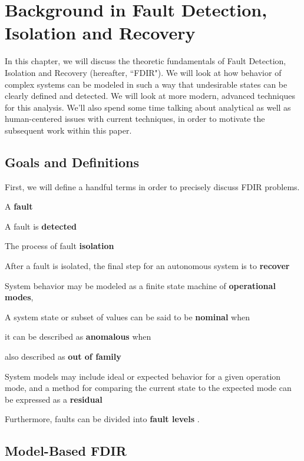 \chapter{Background in Fault Detection, Isolation and Recovery}

In this chapter, we will discuss the theoretic fundamentals of Fault Detection, Isolation and Recovery (hereafter, ``FDIR"). We will look at how behavior of complex systems can be modeled in such a way that undesirable states can be clearly defined and detected. We will look at more modern, advanced techniques for this analysis. We'll also spend some time talking about analytical as well as human-centered issues with current techniques, in order to motivate the subsequent work within this paper.

\section{Goals and Definitions}

First, we will define a handful terms in order to precisely discuss FDIR problems.

A \textbf{fault} 

A fault is \textbf{detected}

The process of fault \textbf{isolation}


After a fault is isolated, the final step for an autonomous system is to \textbf{recover}

System behavior may be modeled as a finite state machine of \textbf{operational modes},

A system state or subset of values can be said to be \textbf{nominal} when

it can be described as \textbf{anomalous} when 

also described as \textbf{out of family}

System models may include ideal or expected behavior for a given operation mode, and a method for comparing the current state to the expected mode can be expressed as a \textbf{residual}

Furthermore, faults can be divided into \textbf{fault levels} \cite{tipaldi2014spacecraft}.


\cite{schwabacher2008pre}
\cite{dearden2004real}





\section{Model-Based FDIR}

